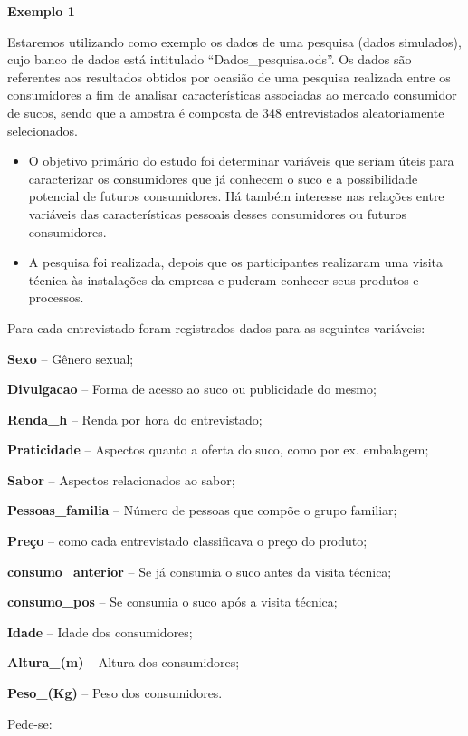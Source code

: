 \documentclass[12pt,brazil,oneside]{book}
\begin{document}
\textbf{Exemplo 1}

Estaremos utilizando como exemplo os dados de uma pesquisa (dados
simulados), cujo banco de dados está intitulado ``Dados\_pesquisa.ods''.
Os dados são referentes aos resultados obtidos por ocasião de uma
pesquisa realizada entre os consumidores a fim de analisar
características associadas ao mercado consumidor de sucos, sendo que a
amostra é composta de 348 entrevistados aleatoriamente selecionados.

\begin{itemize}
\item
  O objetivo primário do estudo foi determinar variáveis que seriam
  úteis para caracterizar os consumidores que já conhecem o suco e a
  possibilidade potencial de futuros consumidores. Há também interesse
  nas relações entre variáveis das características pessoais desses
  consumidores ou futuros consumidores.
\item
  A pesquisa foi realizada, depois que os participantes realizaram uma
  visita técnica às instalações da empresa e puderam conhecer seus
  produtos e processos.
\end{itemize}

Para cada entrevistado foram registrados dados para as seguintes
variáveis:

\textbf{Sexo} -- Gênero sexual;

\textbf{Divulgacao} -- Forma de acesso ao suco ou publicidade do mesmo;

\textbf{Renda\_h} -- Renda por hora do entrevistado;

\textbf{Praticidade} -- Aspectos quanto a oferta do suco, como por ex.
embalagem;

\textbf{Sabor} -- Aspectos relacionados ao sabor;

\textbf{Pessoas\_familia} -- Número de pessoas que compõe o grupo
familiar;

\textbf{Preço} -- como cada entrevistado classificava o preço do
produto;

\textbf{consumo\_anterior} -- Se já consumia o suco antes da visita
técnica;

\textbf{consumo\_pos} -- Se consumia o suco após a visita técnica;

\textbf{Idade} -- Idade dos consumidores;

\textbf{Altura\_(m)} -- Altura dos consumidores;

\textbf{Peso\_(Kg)} -- Peso dos consumidores.

Pede-se:
\end{document}
